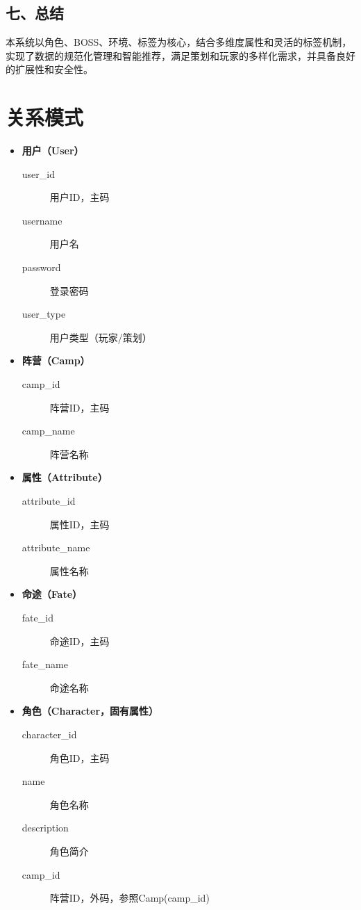 \documentclass{ctexart}
\begin{document}
\subsection{七、总结}
本系统以角色、BOSS、环境、标签为核心，结合多维度属性和灵活的标签机制，实现了数据的规范化管理和智能推荐，满足策划和玩家的多样化需求，并具备良好的扩展性和安全性。

\section{关系模式}
\begin{itemize}
  \item \textbf{用户（User）}
    \begin{description}
      \item[user\_id] 用户ID，主码
      \item[username] 用户名
      \item[password] 登录密码
      \item[user\_type] 用户类型（玩家/策划）
    \end{description}
  \item \textbf{阵营（Camp）}
    \begin{description}
      \item[camp\_id] 阵营ID，主码
      \item[camp\_name] 阵营名称
    \end{description}
  \item \textbf{属性（Attribute）}
    \begin{description}
      \item[attribute\_id] 属性ID，主码
      \item[attribute\_name] 属性名称
    \end{description}
  \item \textbf{命途（Fate）}
    \begin{description}
      \item[fate\_id] 命途ID，主码
      \item[fate\_name] 命途名称
    \end{description}
  \item \textbf{角色（Character，固有属性）}
    \begin{description}
      \item[character\_id] 角色ID，主码
      \item[name] 角色名称
      \item[description] 角色简介
      \item[camp\_id] 阵营ID，外码，参照Camp(camp\_id)

\end{description}
\end{itemize}
\end{document}
